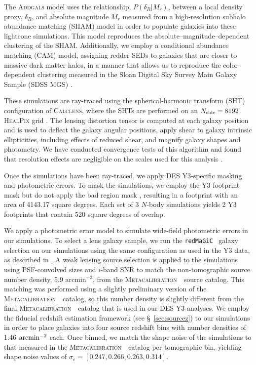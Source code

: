 \documentclass[aps, prd,twocolumn,superscriptaddress,nofootinbib,preprintnumbers]{revtex4-1}
\newcommand{\redmagic}{\texttt{redMaGiC} }
\newcommand{\metacal}{{\textsc{Metacalibration}~}}
\begin{document}
The \textsc{Addgals} model uses the relationship, $P(\delta_{R}|M_r)$, between a local density proxy, $\delta_{R}$, and absolute magnitude $M_r$ measured from a high-resolution subhalo abundance matching (SHAM) model in order to populate galaxies into these lightcone simulations. This model reproduces the absolute--magnitude--dependent clustering of the SHAM. Additionally, we employ a conditional abundance matching (CAM) model, assigning redder SEDs to galaxies that are closer to massive dark matter halos, in a manner that allows us to reproduce the color-dependent clustering measured in the Sloan Digital Sky Survey Main Galaxy Sample (SDSS MGS) \citep{Addgals, DeRose2020b}. 

These simulations are ray-traced using the spherical-harmonic transform (SHT) configuration of \textsc{Calclens}, where the SHTs are performed on an $N_{\rm side}=8192$ \textsc{HealPix} grid \citep{Becker2013}. The lensing distortion tensor is computed at each galaxy position and is used to deflect the galaxy angular positions, apply shear to galaxy intrinsic ellipticities, including effects of reduced shear, and magnify galaxy shapes and photometry. We have conducted convergence tests of this algorithm and found that resolution effects are negligible on the scales used for this analysis \citep{DeRose2019}.

Once the simulations have been ray-traced, we apply DES Y3-specific masking and photometric errors. To mask the simulations, we employ the Y3 footprint mask but do not apply the bad region mask \citep{y3-gold}, resulting in a footprint with an area of 4143.17 square degrees. Each set of 3 $N$-body simulations yields 2 Y3 footprints that contain 520 square degrees of overlap.

We apply a photometric error model to simulate wide-field photometric errors in our simulations. To select a lens galaxy sample, we run the \redmagic\ galaxy selection on our simulations using the same configuration as used in the Y3 data, as described in \citet*{y3-galaxyclustering}. A weak lensing source selection is applied to the simulations using PSF-convolved sizes and $i$-band SNR to match the non-tomographic source number density, 5.9 $\textrm{arcmin}^{-2}$, from the \metacal\ source catalog. This matching was performed using a slightly preliminary version of the \metacal\ catalog, so this number density is slightly different from the final \metacal\ catalog that is used in our DES Y3 analyses. We employ the fiducial redshift estimation framework (see \S~\ref{sec:sourcez}) to our simulations in order to place galaxies into four source redshift bins with number densities of 1.46 $\rm arcmin^{-2}$ each. Once binned, we match the shape noise of the simulations to that measured in the \metacal\ catalog per tomographic bin, yielding shape noise values of $\sigma_{e}=[0.247, 0.266, 0.263, 0.314]$.
\end{document}
